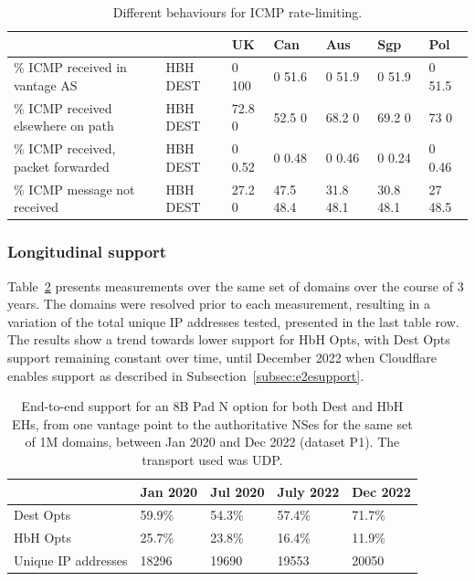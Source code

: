 \documentclass[conference]{IEEEtran}
\begin{document}
\begin{table}
\begin{tabular}{p{}|p{}|p{}|p{}|p{}|p{}|p{}}

\centering

                                           &             & UK        & Can       & Aus    & Sgp          & Pol     \\
                                           \hline

{\% ICMP received in vantage AS}        & {HBH DEST} & {0 100}  & {0 51.6}    & {0 51.9}    & {0 51.9}    & {0 51.5}  \\
\hline
{\% ICMP received elsewhere on path}          & {HBH DEST} & {72.8 0} & {52.5 0}    & {68.2 0}    & {69.2 0}    & {73  0}    \\
\hline

{\% ICMP received, packet forwarded}          & {HBH DEST} & {0 0.52} & {0 0.48}    & {0 0.46}    & {0 0.24}    & {0 0.46}  \\
\hline

{\% ICMP message not received} & {HBH DEST} & {27.2 0} & {47.5 48.4} & {31.8 48.1} & {30.8 48.1} & {27 48.5} 
\end{tabular}
\caption{Different behaviours for ICMP rate-limiting.}
\label{tbl:icmp_support_dst}
\end{table}

\subsubsection{Longitudinal support}

Table~\ref{tbl:longitudinal_support} presents measurements over the same set of domains over the course of 3 years. The domains were resolved prior to each measurement, resulting in a variation of the total unique IP addresses tested, presented in the last table row. The results show a trend towards lower support for HbH Opts, with Dest Opts support remaining constant over time, until December 2022 when Cloudflare enables support as described in Subsection~\ref{subsec:e2esupport}.

\begin{table}
\begin{tabular}{l|l|l|l|l}
                    & Jan 2020 & Jul 2020 & July 2022 & Dec 2022 \\
\hline
Dest Opts & 59.9\%   & 54.3\%   & 57.4\%    & 71.7\%   \\
HbH Opts  & 25.7\%   & 23.8\%   & 16.4\%    & 11.9\%   \\
\hline
Unique IP addresses & 18296    & 19690    & 19553     & 20050   
\end{tabular}
\label{tbl:longitudinal_support}
\caption{End-to-end support for an 8B Pad N option for both Dest and HbH EHs, from one vantage point to the authoritative NSes for the same set of 1M domains, between Jan 2020 and Dec 2022 (dataset P1). The transport used was UDP.}
\end{table}
\end{document}
